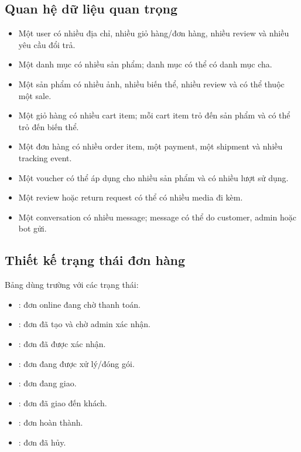 \documentclass[12pt,a4paper]{report}
\begin{document}
\subsection{Quan hệ dữ liệu quan trọng}

\begin{itemize}
    \item Một user có nhiều địa chỉ, nhiều giỏ hàng/đơn hàng, nhiều review và nhiều yêu cầu đổi trả.
    \item Một danh mục có nhiều sản phẩm; danh mục có thể có danh mục cha.
    \item Một sản phẩm có nhiều ảnh, nhiều biến thể, nhiều review và có thể thuộc một sale.
    \item Một giỏ hàng có nhiều cart item; mỗi cart item trỏ đến sản phẩm và có thể trỏ đến biến thể.
    \item Một đơn hàng có nhiều order item, một payment, một shipment và nhiều tracking event.
    \item Một voucher có thể áp dụng cho nhiều sản phẩm và có nhiều lượt sử dụng.
    \item Một review hoặc return request có thể có nhiều media đi kèm.
    \item Một conversation có nhiều message; message có thể do customer, admin hoặc bot gửi.
\end{itemize}

\subsection{Thiết kế trạng thái đơn hàng}

Bảng  dùng trường  với các trạng thái:

\begin{itemize}
    \item {}: đơn online đang chờ thanh toán.
    \item {}: đơn đã tạo và chờ admin xác nhận.
    \item {}: đơn đã được xác nhận.
    \item {}: đơn đang được xử lý/đóng gói.
    \item {}: đơn đang giao.
    \item {}: đơn đã giao đến khách.
    \item {}: đơn hoàn thành.
    \item {}: đơn đã hủy.
\end{itemize}
\end{document}
